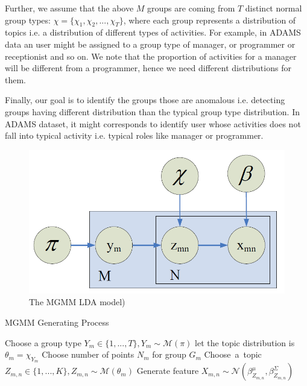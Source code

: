 \documentclass[letterpaper]{article}
\begin{document}
Further, we assume that the above $M$ groups are coming from $T$ distinct normal group types: $\chi = \{\chi_1, \chi_2, ..., \chi_T\}$, where each group represents a distribution of topics i.e. a distribution of different types of activities. For example, in ADAMS data an user might be assigned to a group type of manager, or programmer or receptionist and so on. We note that the proportion of activities for a manager will be different from a programmer, hence we need different distributions for them.

Finally, our goal is to identify the groups those are anomalous i.e. detecting groups  having different distribution than the typical group type distribution. In ADAMS dataset, it might corresponds to identify user whose activities does not fall into typical activity i.e. typical roles like manager or programmer.

\begin{figure}
\begin{center}
\includegraphics[scale=0.4]{lda.png}
\end{center}
\caption{The MGMM LDA model)}\label{ldamodel}
\end{figure}


\begin{algorithm}
\caption{MGMM Generating Process}
\label{algoGenerate}
\begin{algorithmic}[1]
\State Choose a group type $Y_m \in \{1, ..., T\}, Y_m \sim \mathcal{M}(\pi)$  
\State let the topic distribution is $\theta_m = \chi_{Y_m}$
\State Choose number of points $N_m$ for group $G_m$
\State \mbox{Choose a topic $Z_{m,n} \in \{1,...,K\}, Z_{m,n} \sim \mathcal{M}(\theta_m)$}
\State Generate feature $X_{m,n} \sim \mathcal{N}(\beta_{Z_{m,n}}^\mu, \beta_{Z_{m,n}}^\Sigma)$
\EndFor
\EndFor
\end{algorithmic}
\end{algorithm}
\end{document}
